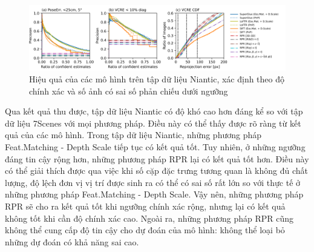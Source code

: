 \begin{figure}
  \centering
  \includegraphics[width=\textwidth]{pics/Proposal/all_niantic.png}
  \caption{Hiệu quả của các mô hình trên tập dữ liệu Niantic, xác định theo độ chính xác và số ảnh có sai số phản chiếu dưới ngưỡng}
\end{figure}

Qua kết quả thu được, tập dữ liệu Niantic có độ khó cao hơn đáng kể so với tập dữ liệu 7Scenes với mọi phương pháp. Điều này có thể thấy được rõ ràng từ kết quả của các mô hình. Trong tập dữ liệu Niantic, những phương pháp Feat.Matching - Depth Scale tiếp tục có kết quả tốt. Tuy nhiên, ở những ngưỡng đáng tin cậy rộng hơn, những phương pháp RPR lại có kết quả tốt hơn. Điều này có thể giải thích được qua việc khi số cặp đặc trưng tương quan là không đủ chất lượng, độ lệch đơn vị vị trí được sinh ra có thể có sai số rất lớn so với thực tế ở những phương pháp Feat.Matching - Depth Scale. Vậy nên, những phương pháp RPR sẽ cho ra kết quả tốt khi ngưỡng chính xác rộng, nhưng lại có kết quả không tốt khi cần độ chính xác cao. Ngoài ra, những phương pháp RPR cũng không thể cung cấp độ tin cậy cho dự đoán của mô hình: không thể loại bỏ những dự đoán có khả năng sai cao.
